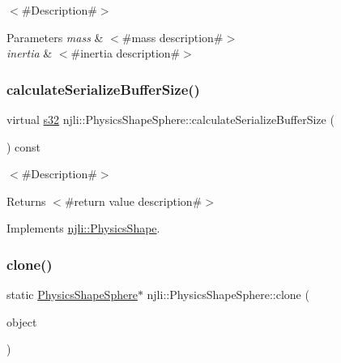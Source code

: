 $<$\#\+Description\#$>$


\begin{DoxyParams}{Parameters}
{\em mass} & $<$\#mass description\#$>$ \\
\hline
{\em inertia} & $<$\#inertia description\#$>$ \\
\hline
\end{DoxyParams}
\mbox{\label{classnjli_1_1_physics_shape_sphere_a048ff733f942dcac60a7d2b382a1d0a3}} 
\subsubsection{\texorpdfstring{calculate\+Serialize\+Buffer\+Size()}{calculateSerializeBufferSize()}}
{\footnotesize\ttfamily virtual \mbox{\hyperlink{_util_8h_aa62c75d314a0d1f37f79c4b73b2292e2}{s32}} njli\+::\+Physics\+Shape\+Sphere\+::calculate\+Serialize\+Buffer\+Size (\begin{DoxyParamCaption}{ }\end{DoxyParamCaption}) const\hspace{0.3cm}{\ttfamily [virtual]}}

$<$\#\+Description\#$>$

\begin{DoxyReturn}{Returns}
$<$\#return value description\#$>$ 
\end{DoxyReturn}


Implements \mbox{\hyperlink{classnjli_1_1_physics_shape_a0612a1c8c3f4520d78cb7f5838f03074}{njli\+::\+Physics\+Shape}}.

\mbox{\label{classnjli_1_1_physics_shape_sphere_a62800c61cc69cab1aa03734fdf0090c6}} 
\subsubsection{\texorpdfstring{clone()}{clone()}}
{\footnotesize\ttfamily static \mbox{\hyperlink{classnjli_1_1_physics_shape_sphere}{Physics\+Shape\+Sphere}}$\ast$ njli\+::\+Physics\+Shape\+Sphere\+::clone (\begin{DoxyParamCaption}\item[{const \mbox{\hyperlink{classnjli_1_1_physics_shape_sphere}{Physics\+Shape\+Sphere}} \&}]{object }\end{DoxyParamCaption})\hspace{0.3cm}{\ttfamily [static]}}

